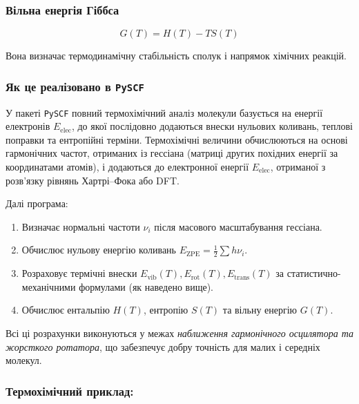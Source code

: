 {%
\subsubsection{Вільна енергія Гіббса}

\[
    G(T) = H(T) - TS(T)
\]

Вона визначає термодинамічну стабільність сполук
і напрямок хімічних реакцій.

\subsubsection{Як це реалізовано в \texttt{PySCF}}
У пакеті \texttt{PySCF} повний термохімічний аналіз молекули базується
на енергії електронів $E_{\text{elec}}$, до якої послідовно додаються
внески нульових коливань, теплові поправки та ентропійні терміни. Термохімічні величини обчислюються
на основі гармонічних частот, отриманих із гессіана
(матриці других похідних енергії за координатами атомів),
і додаються до електронної енергії $E_{\text{elec}}$,
отриманої з розв’язку рівнянь Хартрі–Фока або DFT.

Далі програма:
\begin{enumerate}
    \item Визначає нормальні частоти $\nu_i$ після масового масштабування гессіана.
    \item Обчислює нульову енергію коливань $E_{\text{ZPE}} = \tfrac{1}{2}\sum h\nu_i$.
    \item Розраховує термічні внески $E_{\text{vib}}(T), E_{\text{rot}}(T), E_{\text{trans}}(T)$
          за статистично-механічними формулами (як наведено вище).
    \item Обчислює ентальпію $H(T)$, ентропію $S(T)$ та вільну енергію $G(T)$.
\end{enumerate}

Всі ці розрахунки виконуються у межах
\emph{наближення гармонічного осцилятора та жорсткого ротатора},
що забезпечує добру точність для малих і середніх молекул.


\subsubsection{Термохімічний приклад: }

}
